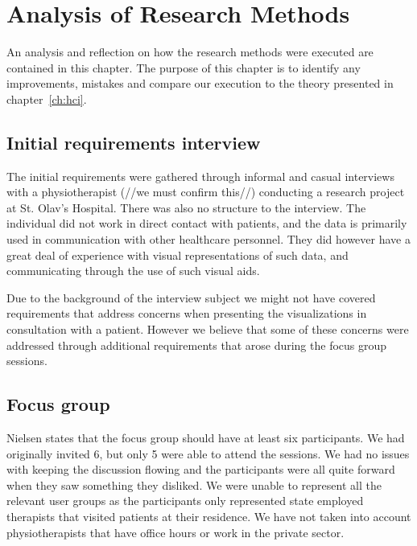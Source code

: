 \chapter{Analysis of Research Methods}
An analysis and reflection on how the research methods were executed are contained in this chapter. The purpose of this chapter is to identify any improvements, mistakes and compare our execution to the theory presented in chapter~\ref{ch:hci}.

\section{Initial requirements interview}
The initial requirements were gathered through informal and casual interviews with a physiotherapist (//we must confirm this//) conducting a research project at St. Olav's Hospital. There was also no structure to the interview. The individual did not work in direct contact with patients, and the data is primarily used in communication with other healthcare personnel. 
They did however have a great deal of experience with visual representations of such data, and communicating through the use of such visual aids.

Due to the background of the interview subject we might not have covered requirements that address concerns when presenting the visualizations in consultation with a patient. 
However we believe that some of these concerns were addressed through additional requirements that arose during the focus group sessions.

\section{Focus group}
Nielsen states that the focus group should have at least six participants. We had originally invited 6, but only 5 were able to attend the sessions. We had no issues with keeping the discussion flowing and the participants were all quite forward when they saw something they disliked. We were unable to represent all the relevant user groups as the participants only represented state employed therapists that visited patients at their residence. We have not taken into account physiotherapists that have office hours or work in the private sector.

